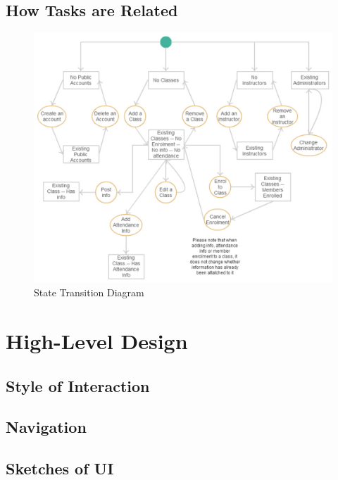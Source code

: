 \documentclass[11pt, article]{article}
\begin{document}
	\newpage
	\subsection{How Tasks are Related}
	
			\begin{figure}[ht!]
	\includegraphics[scale=0.8]{images/statediagram}
 	\caption{State Transition Diagram}
	\end{figure}
	
	\section{High-Level Design}

	\subsection{Style of Interaction}

	

	\subsection{Navigation}

	\subsection{Sketches of UI}
\end{document}
